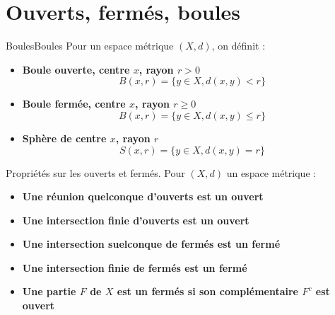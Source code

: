 \section{Ouverts, fermés, boules}
\begin{definition}{Boules}{Boules}
    Pour un espace métrique $(X,d)$, on définit :
    \begin{itemize}
        \item \textbf{Boule ouverte, centre $x$, rayon $r > 0$}
        \begin{equation}
            B(x,r) = \{ y \in X, d(x,y) < r\}
        \end{equation} 
        \item \textbf{Boule fermée, centre $x$, rayon $r \ge 0$}
        \begin{equation}
            B(x,r) = \{ y \in X, d(x,y) \le r\}
        \end{equation} 
        \item \textbf{Sphère de centre $x$, rayon $r$}
        \begin{equation}
            S(x,r) = \{ y \in X, d(x,y) = r\}
        \end{equation} 
    \end{itemize}
\end{definition}
Propriétés sur les ouverts et fermés. Pour $(X,d)$ un espace métrique : \newline
\begin{itemize}
    \item \textbf{Une réunion quelconque d'ouverts est un ouvert} \newline
    \item \textbf{Une intersection finie d'ouverts est un ouvert} \newline
    \item \textbf{Une intersection suelconque de fermés est un fermé} \newline
    \item \textbf{Une intersection finie de fermés est un fermé} \newline
    \item \textbf{Une partie $F$ de $X$ est un fermés si son complémentaire $F^{c}$ est ouvert}
\end{itemize}
\newpage
